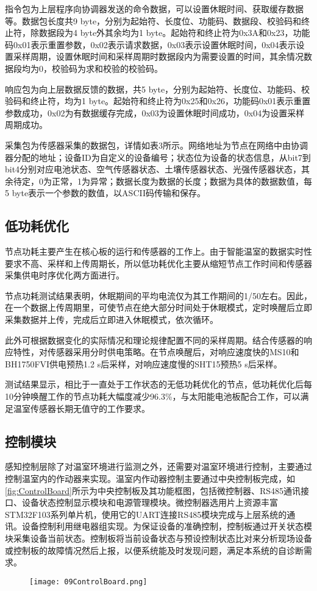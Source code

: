 指令包为上层程序向协调器发送的命令数据，可以设置休眠时间、获取缓存数据等。数据包长度共9 byte，分别为起始符、长度位、功能码、数据段、校验码和终止符，除数据段为4 byte外其余均为1 byte。起始符和终止符为0x3A和0x23，功能码0x01表示重置参数，0x02表示请求数据，0x03表示设置休眠时间，0x04表示设置采样周期，设置休眠时间和采样周期时数据段内为需要设置的时间，其余情况数据段均为0，校验码为求和校验的校验码。

响应包为向上层数据反馈的数据，共5 byte，分别为起始符、长度位、功能码、校验码和终止符，均为1 byte。起始符和终止符为0x25和0x26，功能码0x01表示重置参数成功，0x02为有数据缓存完成，0x03为设置休眠时间成功，0x04为设置采样周期成功。

采集包为传感器采集的数据包，详情如表3所示。网络地址为节点在网络中由协调器分配的地址；设备ID为自定义的设备编号；状态位为设备的状态信息，从bit7到bit4分别对应电池状态、空气传感器状态、土壤传感器状态、光强传感器状态，其余待定，0为正常，1为异常；数据长度为数据的长度；数据为具体的数据数值，每5 byte表示一个参数的数值，以ASCII码传输和保存。

	\subsection{低功耗优化}
	节点功耗主要产生在核心板的运行和传感器的工作上。由于智能温室的数据实时性要求不高、采样和上传周期长，所以低功耗优化主要从缩短节点工作时间和传感器采集供电时序优化两方面进行。
	
节点功耗测试结果表明，休眠期间的平均电流仅为其工作期间的1/50左右。因此，在一个数据上传周期里，可使节点在绝大部分时间处于休眠模式，定时唤醒后立即采集数据并上传，完成后立即进入休眠模式，依次循环。

此外可根据数据变化的实际情况和理论规律配置不同的采样周期。结合传感器的响应特性，对传感器采用分时供电策略。在节点唤醒后，对响应速度快的MS10和BH1750FVI供电预热1.2 s后采样，对响应速度慢的SHT15预热5 s后采样。

测试结果显示，相比于一直处于工作状态的无低功耗优化的节点，低功耗优化后每10分钟唤醒工作的节点功耗大幅度减少96.3\%，与太阳能电池板配合工作，可以满足温室传感器长期无值守的工作要求。

	\subsection{控制模块}
	感知控制层除了对温室环境进行监测之外，还需要对温室环境进行控制，主要通过控制温室内的作动器来实现。温室内作动器控制主要通过中央控制板完成，如\ref{fig:ControlBoard}所示为中央控制板及其功能框图，包括微控制器、RS485通讯接口、设备状态控制显示模块和电源管理模块。微控制器选用片上资源丰富STM32F103系列单片机，使用它的UART连接RS485模块完成与上层系统的通讯。设备控制利用继电器组实现。为保证设备的准确控制，控制板通过开关状态模块采集设备当前状态。控制板将当前设备状态与预设控制状态比对来分析现场设备或控制板的故障情况然后上报，以便系统能及时发现问题，满足本系统的自诊断需求。
	  	\begin{figure}[!htp]
  			\centering
 			\texttt{[image: 09ControlBoard.png]}
		\end{figure}
